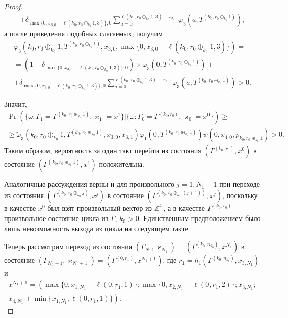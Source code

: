 \documentclass[a4paper,12pt,russian]{extarticle}
\begin{document}
\begin{proof}
\begin{multline*}
+\delta_{\max{\{0,x_{3,0} - \ell(k_0,r_0\oplus_{k_0}1,3)\}},0} \sum_{a=0}^{\ell(k_0,r_0\oplus_{k_0}1,3)-x_{3,0}}\varphi_3 (a,T^{(k_0,r_0\oplus_{k_0}1)}),
\end{multline*}
а после приведения подобных слагаемых, получим
\begin{multline*}
\widetilde{\varphi}_3(k_0,r_0\oplus_{k_0}1,T^{(k_0,r_0\oplus_{k_0}1)},x_{3,0},\max{\{0,x_{3,0} - \ell(k_0,r_0\oplus_{k_0}1,3)\}})=\\=(1-\delta_{\max{\{0,x_{3,0} - \ell(k_0,r_0\oplus_{k_0}1,3)\}},0}) \times \varphi_3(0,T^{(k_0,r_0\oplus_{k_0}1)} ) +\\
+\delta_{\max{\{0,x_{3,0} - \ell(k_0,r_0\oplus_{k_0}1,3)\}},0} \sum_{a=0}^{\ell(k_0,r_0\oplus_{k_0}1,3)-x_{3,0}}\varphi_3 (a,T^{(k_0,r_0\oplus_{k_0}1)})>0.
\end{multline*}

Значит,
\begin{multline*}
\Pr (\{\omega\colon \Gamma_{1}=\Gamma^{(k_0,r_0\oplus_{k_0}1)},\varkappa_{1}=x^1\} | \{\omega\colon \Gamma_{0}=\Gamma^{(k_0,r_0)},\varkappa_0=x^0\})\geqslant \\
\geqslant \widetilde{\varphi}_3(k_0,r_0\oplus_{k_0}1,T^{(k_0,r_0\oplus_{k_0}1)},x_{3,0},x_{3,1})
\varphi_1(0,T^{(k_0,r_0\oplus_{k_0}1)})  \psi(0,x_{4,0}, p_{k_0,r_0\oplus_{k_0}1}) > 0.
\end{multline*}
Таким образом, вероятность за один такт перейти из состояния $(\Gamma^{(k_0,r_0)}, x^0)$ в состояние $ (\Gamma^{(k_0,r_0\oplus_{k_0}1)}, x^1)$ положительна.

Аналогичные рассуждения верны и для произвольного $j=\overline{1,N_1-1}$
при переходе из состояния $(\Gamma^{(k_0,r_0\oplus_{k_0} j)},x^j)$ в состояние $(\Gamma^{(k_0,r_0\oplus_{k_0}(j+1))},x^j)$, поскольку в качестве $x^0$ был взят произвольный вектор из $\mathbb{Z}_+^4$, а в качестве $\Gamma^{(k_0,r_0)}$ --- произвольное состояние цикла из $\Gamma$, $k_0>0$. Единственным предположением было лишь невозможность выхода из цикла на следующем такте.

Теперь рассмотрим переход из состояния $(\Gamma_{N_1},\varkappa_{N_1}) = (\Gamma^{(k_0,n_{k_0})},x^{N_1})$ в состояние $(\Gamma_{N_1+1},\varkappa_{N_1+1}) = (\Gamma^{(0,r_1)},x^{N_1+1})$, где $r_1 = h_1(\Gamma^{(k_0,n_{k_0})},x_{3,N_1})$ и 
\begin{multline*}
x^{N_1+1}=\left(\max{\{0,x_{1,N_1} - \ell(0,r_1,1)\}};
\max{\{0,x_{2,N_1} - \ell(0,r_1,2)\}};x_{3,N_1};\right.\\
\left.
x_{4,N_1} + \min{\{x_{1,N_1}, \ell(0,r_1,1)\}}\right).
\end{multline*}


\end{proof}
\end{document}
